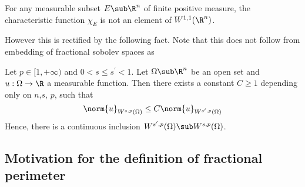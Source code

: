 \documentclass[../main.tex]{subfiles}
\begin{document}
\begin{fact}
    For any measurable subset $ E\sub \R^{n} $ of finite positive measure, the characteristic function $ \chi_{E} $ is not an element of $ W^{1,1}(\R^{n})$.
\end{fact}




However this is rectified by the following fact. Note that this does not follow from embedding of fractional sobolev spaces as $  $



\begin{proposition}
    Let $ p\in[1,+\infty) $ and $ 0 < s \leq s^{\prime} < 1 $. Let $ \Omega\sub \R^{n} $ be an open set and $ u:\Omega\to \R $ a measurable function. Then there exists a constant $ C \geq 1 $ depending only on $ n$,$s$, $p$, such that
    \[
        \norm{u}_{W^{s,p}(\Omega)} \leq C\norm{u}_{W^{s^{\prime},p}(\Omega)}
    \]
    Hence, there is a continuous inclusion $ W^{s^{\prime},p}(\Omega)\sub W^{s,p}(\Omega)$.
\end{proposition}



\subsection{Motivation for the definition of fractional perimeter}

\end{document}
